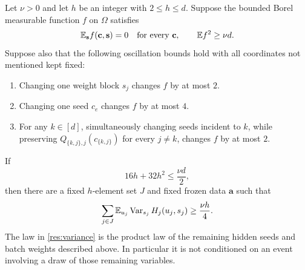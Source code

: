 \begin{lemma}
\label{res:private-variance}
Let \(\nu>0\) and let \(h\) be an integer with \(2\leq h\leq d\).
Suppose the bounded Borel measurable function \(f\) on \(\Omega\) satisfies
\begin{equation}\label{res:variance-hypotheses}
 \mathbb E_{\mathbf s}f(\mathbf c,\mathbf s)=0
       \quad\text{for every }\mathbf c,
 \qquad \mathbb E f^2\geq\nu d.
\end{equation}
Suppose also that the following oscillation bounds hold with all coordinates
not mentioned kept fixed:
\begin{enumerate}[label=\textup{(\roman*)}]
 \item Changing one weight block \(s_j\) changes \(f\) by at most \(2\).
 \item Changing one seed \(c_e\) changes \(f\) by at most \(4\).
 \item For any \(k\in[d]\), simultaneously changing seeds incident to
 \(k\), while preserving \(Q_{\{k,j\},j}(c_{\{k,j\}})\) for every
 \(j\ne k\), changes \(f\) by at most \(2\).
\end{enumerate}
If
\begin{equation}\label{res:scale}
 16h+32h^2\leq\frac{\nu d}{2},
\end{equation}
then there are a fixed \(h\)-element set \(J\) and fixed frozen data
\(\mathbf a\) such that
\begin{equation}\label{res:variance}
 \sum_{j\in J}\mathbb E_{u_j}\operatorname{Var}_{s_j}H_j(u_j,s_j)
       \geq\frac{\nu h}{4}.
\end{equation}
The law in \eqref{res:variance} is the product law of the remaining hidden
seeds and batch weights described above.  In particular it is not conditioned
on an event involving a draw of those remaining variables.
\end{lemma}

